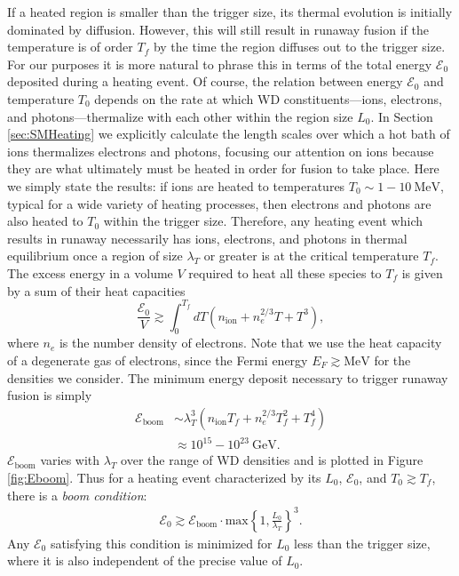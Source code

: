 \documentclass[twocolumn, preprintnumbers,amsmath,amssymb,prd, superscriptaddress]{revtex4}
\newcommand{\Ez}{\mathcal{E}_0}
\newcommand{\Eboom}{\mathcal{E}_\text{boom}}
\newcommand{\GeV}{\text{GeV}}
\newcommand{\MeV}{\text{MeV}}
\begin{document}
If a heated region is smaller than the trigger size, its thermal evolution is initially dominated by diffusion.
However, this will still result in runaway fusion if the temperature is of order $T_f$ by the time the region diffuses out to the trigger size.
For our purposes it is more natural to phrase this in terms of the total energy $\Ez$ deposited during a heating event.
Of course, the relation between energy $\Ez$ and temperature $T_0$ depends on the rate at which WD constituents---ions, electrons, and photons---thermalize with each other within the region size $L_0$.
In Section \ref{sec:SMHeating} we explicitly calculate the length scales over which a hot bath of ions thermalizes electrons and photons, focusing our attention on ions because they are what ultimately must be heated in order for fusion to take place.
Here we simply state the results: if ions are heated to temperatures $T_0 \sim 1 - 10 ~\MeV$, typical for a wide variety of heating processes, then electrons and photons are also heated to $T_0$ within the trigger size.
Therefore, any heating event which results in runaway necessarily has ions, electrons, and photons in thermal equilibrium once a region of size $\lambda_T$ or greater is at the critical temperature $T_f$.
The excess energy in a volume $V$ required to heat all these species to $T_f$ is given by a sum of their heat capacities
\begin{equation}
\label{eq:heatcapacity}
  \frac{\Ez}{V} \gtrsim \int_0^{T_f} dT (n_\text{ion} + n_e^{2/3} T + T^3),
\end{equation}
where $n_e$ is the number density of electrons. 
Note that we use the heat capacity of a degenerate gas of electrons, since the Fermi energy $E_F \gtrsim \MeV$ for the densities we consider.
The minimum energy deposit necessary to trigger runaway fusion is simply
\begin{align}
\label{eq:Eboom}
\Eboom &\sim \lambda_T^3 (n_\text{ion} T_f + n_e^{2/3} T_f^2 + T_f^4) \\
         &\approx 10^{15} - 10^{23} ~\GeV \nonumber.
\end{align}
$\Eboom$ varies with $\lambda_T$ over the range of WD densities and is plotted in Figure \ref{fig:Eboom}.
Thus for a heating event characterized by its $L_0$, $\Ez$, and $T_0 \gtrsim T_f$, there is a \emph{boom condition}:
\begin{align}
    \label{eq:energy_boom_condition}
    \Ez \gtrsim
    \Eboom \cdot \text{max}\left\{1, \frac{L_0}{\lambda_T}\right\}^3.
\end{align}
Any $\Ez$ satisfying this condition is minimized for $L_0$ less than the trigger size, where it is also independent of the precise value of $L_0$.
\end{document}
